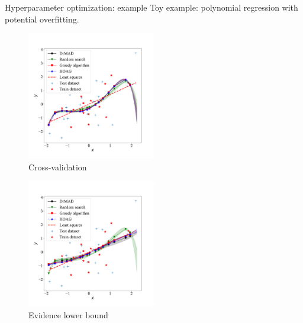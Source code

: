 \documentclass[usenames,dvipsnames,11pt,pdf,utf8,russian,aspectratio=169]{beamer}
\begin{document}
\begin{frame}{Hyperparameter optimization: example}
Toy example: polynomial regression with potential overfitting.\\

\begin{multicols}{2}

\begin{figure}[h]
\hspace*{-1cm}
\includegraphics[width=0.5\textwidth]{./slide_plots/Fig_poly_cv2.pdf}
\caption*{Cross-validation}
\end{figure}

\begin{figure}[h]
\hspace*{-1cm}
\includegraphics[width=0.5\textwidth]{./slide_plots/Fig_poly_var2.pdf}
\caption*{Evidence lower bound}
\end{figure}
\end{multicols}

\end{frame}
\end{document}
